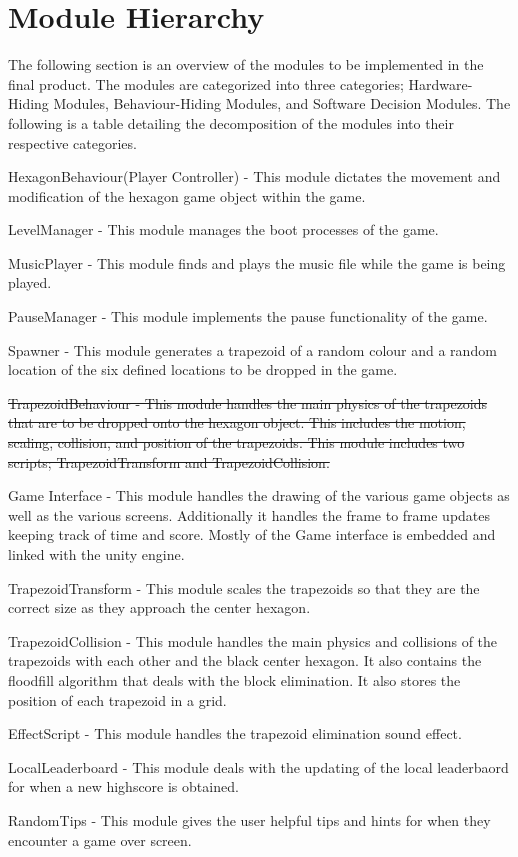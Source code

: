 \documentclass[12pt, titlepage]{article}
\begin{document}
\section{Module Hierarchy}
The following section is an overview of the modules to be implemented in the final product. The modules are categorized into three categories; Hardware-Hiding Modules, Behaviour-Hiding Modules, and Software Decision Modules. The following is a table detailing the decomposition of the modules into their respective categories.

\begin{enumerate}[label=\textbf{M\arabic*:}]
  \item HexagonBehaviour(Player Controller) - This module dictates the movement and modification of the hexagon game object within the game.
  \item LevelManager - This module manages the boot processes of the game.
  \item MusicPlayer - This module finds and plays the music file while the game is being played.
  \item PauseManager - This module implements the pause functionality of the game.
  \item Spawner - This module generates a trapezoid of a random colour and a random location of the six defined locations to be dropped in the game.


  \item \sout{TrapezoidBehaviour - This module handles the main physics of the trapezoids that are to be dropped onto the hexagon object. This includes the motion, scaling, collision, and position of the trapezoids. This module includes two scripts; TrapezoidTransform and TrapezoidCollision.}
  
  
  \item Game Interface - This module handles the drawing of the various game objects as well as the various screens. Additionally it handles the frame to frame updates keeping track of time and score. Mostly of the Game interface is embedded and linked with the unity engine.
  
  
{\color{blue}
  \item TrapezoidTransform - This module scales the trapezoids so that they are the correct size as they approach the center hexagon. 
  
  \item TrapezoidCollision - This module handles the main physics and collisions of the trapezoids with each other and the black center hexagon. It also contains the floodfill algorithm that deals with the block elimination. It also stores the position of each trapezoid in a grid.

  \item EffectScript - This module handles the trapezoid elimination sound effect.
  
  \item LocalLeaderboard - This module deals with the updating of the local leaderbaord for when a new highscore is obtained.
  
  \item RandomTips - This module gives the user helpful tips and hints for when they encounter a game over screen.
}
\end{enumerate}
\end{document}
